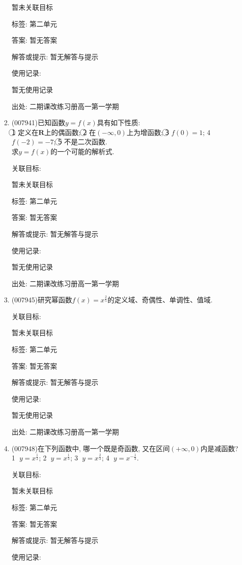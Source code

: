 \documentclass[10pt,a4paper]{article}
\begin{document}
\begin{enumerate}[1.]
暂未关联目标



标签: 第二单元

答案: 暂无答案

解答或提示: 暂无解答与提示

使用记录:

暂无使用记录


出处: 二期课改练习册高一第一学期
\item { (007941)}已知函数$y=f(x)$具有如下性质:\\
\textcircled{1} 定义在$\mathbf{R}$上的偶函数; \textcircled{2} 在$(-\infty ,0)$上为增函数; \textcircled{3} $f(0)=1$; \textcircled{4} $f(-2)=-7$; \textcircled{5} 不是二次函数.\\
求$y=f(x)$的一个可能的解析式.


关联目标:

暂未关联目标



标签: 第二单元

答案: 暂无答案

解答或提示: 暂无解答与提示

使用记录:

暂无使用记录


出处: 二期课改练习册高一第一学期
\item { (007945)}研究幂函数$f(x)=x^{\frac 25}$的定义域、奇偶性、单调性、值域.


关联目标:

暂未关联目标



标签: 第二单元

答案: 暂无答案

解答或提示: 暂无解答与提示

使用记录:

暂无使用记录


出处: 二期课改练习册高一第一学期
\item { (007948)}在下列函数中, 哪一个既是奇函数, 又在区间$(+\infty ,0)$内是减函数?\\ 
\textcircled{1} $y=x^{\frac 12}$; \textcircled{2} $y=x^{\frac 13}$; \textcircled{3} $y=x^{\frac 23}$; \textcircled{4} $y=x^{-\frac 13}$.


关联目标:

暂未关联目标



标签: 第二单元

答案: 暂无答案

解答或提示: 暂无解答与提示

使用记录:


\end{enumerate}
\end{document}

